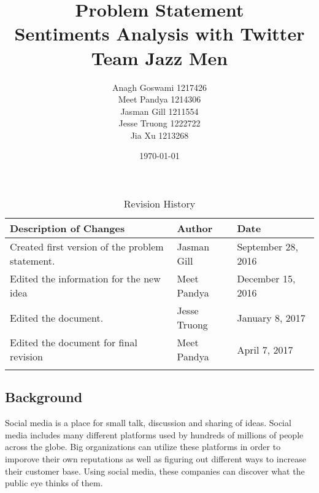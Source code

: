 \documentclass[12pt]{article}
\begin{document}
\title{Problem Statement\\  Sentiments Analysis with Twitter \\Team Jazz Men}
\author{Anagh Goswami 1217426 \\ Meet Pandya 1214306 \\ Jasman Gill  1211554 \\ Jesse Truong  1222722 \\ Jia Xu  1213268 \\}
\date{\today}
\maketitle
{}
\newpage


\begin{table}[h]
\centering
\caption{Revision History}
\begin{tabular}{|l|l|l|}
\Xhline{2\arrayrulewidth}
\bf Description of Changes & \bf Author & \bf Date\\\hline
Created first version of the  problem statement. & Jasman Gill & September 28, 2016\\\midrule
Edited the information for the new idea & Meet Pandya & December 15, 2016\\\midrule
Edited the document. &Jesse Truong &January 8, 2017\\\bottomrule
Edited the document for final revision &Meet Pandya & April 7, 2017\\\bottomrule
\Xhline{2\arrayrulewidth}
\end{tabular}
\end{table}

\subsection*{Background}
Social media is a place for small talk, discussion and sharing of ideas. Social media includes many different platforms used by hundreds of millions of people across the globe. Big organizations can utilize these platforms in order to imporove their own reputations as well as figuring out different ways to increase their customer base. Using social media, these companies can discover what the public eye thinks of them.\\
\end{document}
